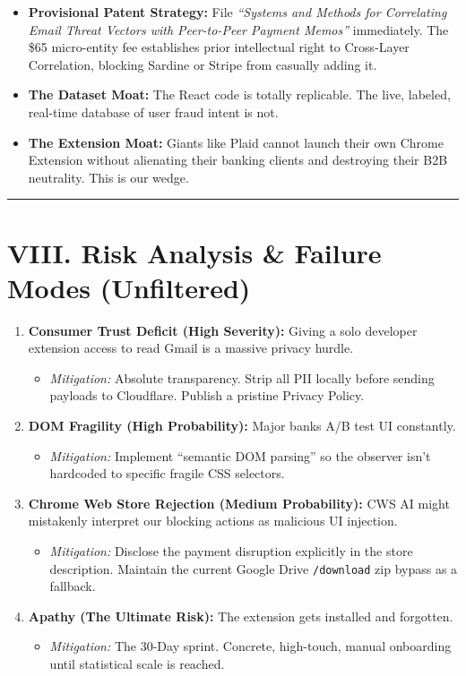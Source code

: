 \documentclass[11pt, letterpaper]{article}
\begin{document}
\begin{itemize}
    \item \textbf{Provisional Patent Strategy:} File \textit{``Systems and Methods for Correlating Email Threat Vectors with Peer-to-Peer Payment Memos''} immediately. The \$65 micro-entity fee establishes prior intellectual right to Cross-Layer Correlation, blocking Sardine or Stripe from casually adding it.
    \item \textbf{The Dataset Moat:} The React code is totally replicable. The live, labeled, real-time database of user fraud intent is not. 
    \item \textbf{The Extension Moat:} Giants like Plaid cannot launch their own Chrome Extension without alienating their banking clients and destroying their B2B neutrality. This is our wedge.
\end{itemize}

\vspace{12pt}
\hrule
\vspace{12pt}

\section*{VIII. Risk Analysis \& Failure Modes (Unfiltered)}

\begin{enumerate}
    \item \textbf{Consumer Trust Deficit (High Severity):} Giving a solo developer extension access to read Gmail is a massive privacy hurdle.
    \begin{itemize}
        \item \textit{Mitigation:} Absolute transparency. Strip all PII locally before sending payloads to Cloudflare. Publish a pristine Privacy Policy.
    \end{itemize}
    \item \textbf{DOM Fragility (High Probability):} Major banks A/B test UI constantly.
    \begin{itemize}
        \item \textit{Mitigation:} Implement ``semantic DOM parsing'' so the observer isn't hardcoded to specific fragile CSS selectors.
    \end{itemize}
    \item \textbf{Chrome Web Store Rejection (Medium Probability):} CWS AI might mistakenly interpret our blocking actions as malicious UI injection.
    \begin{itemize}
        \item \textit{Mitigation:} Disclose the payment disruption explicitly in the store description. Maintain the current Google Drive \texttt{/download} zip bypass as a fallback.
    \end{itemize}
    \item \textbf{Apathy (The Ultimate Risk):} The extension gets installed and forgotten. 
    \begin{itemize}
        \item \textit{Mitigation:} The 30-Day sprint. Concrete, high-touch, manual onboarding until statistical scale is reached.
    \end{itemize}
\end{enumerate}
\end{document}
